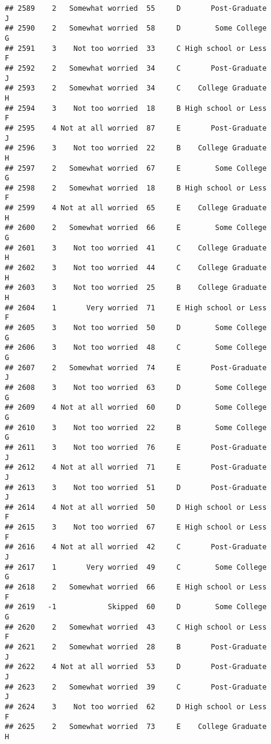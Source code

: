 \documentclass[
]{article}
\begin{document}
\begin{verbatim}
## 2589    2   Somewhat worried  55     D       Post-Graduate         J
## 2590    2   Somewhat worried  58     D        Some College         G
## 2591    3    Not too worried  33     C High school or Less         F
## 2592    2   Somewhat worried  34     C       Post-Graduate         J
## 2593    2   Somewhat worried  34     C    College Graduate         H
## 2594    3    Not too worried  18     B High school or Less         F
## 2595    4 Not at all worried  87     E       Post-Graduate         J
## 2596    3    Not too worried  22     B    College Graduate         H
## 2597    2   Somewhat worried  67     E        Some College         G
## 2598    2   Somewhat worried  18     B High school or Less         F
## 2599    4 Not at all worried  65     E    College Graduate         H
## 2600    2   Somewhat worried  66     E        Some College         G
## 2601    3    Not too worried  41     C    College Graduate         H
## 2602    3    Not too worried  44     C    College Graduate         H
## 2603    3    Not too worried  25     B    College Graduate         H
## 2604    1       Very worried  71     E High school or Less         F
## 2605    3    Not too worried  50     D        Some College         G
## 2606    3    Not too worried  48     C        Some College         G
## 2607    2   Somewhat worried  74     E       Post-Graduate         J
## 2608    3    Not too worried  63     D        Some College         G
## 2609    4 Not at all worried  60     D        Some College         G
## 2610    3    Not too worried  22     B        Some College         G
## 2611    3    Not too worried  76     E       Post-Graduate         J
## 2612    4 Not at all worried  71     E       Post-Graduate         J
## 2613    3    Not too worried  51     D       Post-Graduate         J
## 2614    4 Not at all worried  50     D High school or Less         F
## 2615    3    Not too worried  67     E High school or Less         F
## 2616    4 Not at all worried  42     C       Post-Graduate         J
## 2617    1       Very worried  49     C        Some College         G
## 2618    2   Somewhat worried  66     E High school or Less         F
## 2619   -1            Skipped  60     D        Some College         G
## 2620    2   Somewhat worried  43     C High school or Less         F
## 2621    2   Somewhat worried  28     B       Post-Graduate         J
## 2622    4 Not at all worried  53     D       Post-Graduate         J
## 2623    2   Somewhat worried  39     C       Post-Graduate         J
## 2624    3    Not too worried  62     D High school or Less         F
## 2625    2   Somewhat worried  73     E    College Graduate         H

\end{verbatim}
\end{document}
